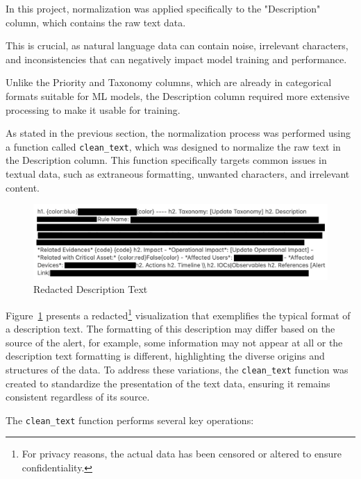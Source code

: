 In this project, normalization was applied specifically to the "Description" column, which contains the raw text data. 

This is crucial, as natural language data can contain noise, irrelevant characters, and inconsistencies that can negatively impact model training and performance. 

Unlike the Priority and Taxonomy columns, which are already in categorical formats suitable for ML models, the Description column required more extensive processing to make it usable for training.

As stated in the previous section, the normalization process was performed using a function called \texttt{clean\_text}, which was designed to normalize the raw text in the Description column. 
This function specifically targets common issues in textual data, such as extraneous formatting, unwanted characters, and irrelevant content.

\begin{figure}[h!]
    \centering
    \includegraphics[width=\textwidth]{ch3/assets/redacted_description_text.png}
    \caption{Redacted Description Text}
    \label{fig:redacted_description_text}
\end{figure}

Figure~\ref{fig:redacted_description_text} presents a redacted\footnote{For privacy reasons, the actual data has been censored or altered to ensure confidentiality.} visualization that exemplifies the typical format of a description text.
The formatting of this description may differ based on the source of the alert, for example, some information may not appear at all or the description text formatting is different, highlighting the diverse origins and structures of the data. 
To address these variations, the \texttt{clean\_text} function was created to standardize the presentation of the text data, ensuring it remains consistent regardless of its source.

The \texttt{clean\_text} function performs several key operations:

